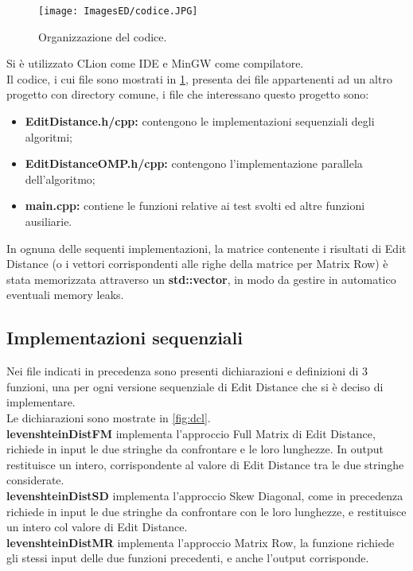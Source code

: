 \documentclass[10pt,twocolumn,letterpaper]{article}
\newcommand{\bit} {\begin{itemize} }
\newcommand{\eit} {\end{itemize} }
\begin{document}
\begin{figure}[h]
    \centering
    \texttt{[image: ImagesED/codice.JPG]}
    \caption{Organizzazione del codice.}
    \label{fig:ci}
\end{figure}

Si è utilizzato CLion come IDE e MinGW come compilatore.\\
Il codice, i cui file sono mostrati in \cref{fig:ci}, presenta dei file appartenenti ad un altro progetto con directory comune, i file che interessano questo progetto sono:

\bit
    \item{\textbf{EditDistance.h/cpp:} contengono le implementazioni sequenziali degli algoritmi;}
    \item{\textbf{EditDistanceOMP.h/cpp:} contengono l'implementazione parallela dell'algoritmo;}
    \item{\textbf{main.cpp:} contiene le funzioni relative ai test svolti ed altre funzioni ausiliarie.}
\eit

In ognuna delle sequenti implementazioni, la matrice contenente i risultati di Edit Distance (o i vettori corrispondenti alle righe della matrice per Matrix Row) è stata memorizzata attraverso un \textbf{std::vector}, in modo da gestire in automatico eventuali memory leaks.

\subsection{Implementazioni sequenziali}
Nei file indicati in precedenza sono presenti dichiarazioni e definizioni di 3 funzioni, una per ogni versione sequenziale di Edit Distance che si è deciso di implementare.\\
Le dichiarazioni sono mostrate in \cref{fig:dcl}.\\
\textbf{levenshteinDistFM} implementa l'approccio Full Matrix di Edit Distance, richiede in input le due stringhe da confrontare e le loro lunghezze. In output restituisce un intero, corrispondente al valore di Edit Distance tra le due stringhe considerate.\\
\textbf{levenshteinDistSD} implementa l'approccio Skew Diagonal, come in precedenza richiede in input le due stringhe da confrontare con le loro lunghezze, e restituisce un intero col valore di Edit Distance.\\
\textbf{levenshteinDistMR} implementa l'approccio Matrix Row, la funzione richiede gli stessi input delle due funzioni precedenti, e anche l'output corrisponde.
\end{document}
